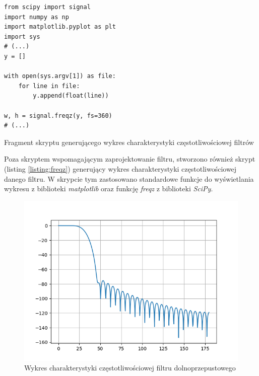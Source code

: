 \begin{listing}
\begin{verbatim}
from scipy import signal
import numpy as np
import matplotlib.pyplot as plt
import sys
# (...)
y = []

with open(sys.argv[1]) as file:
    for line in file:
        y.append(float(line))        

w, h = signal.freqz(y, fs=360)
# (...)
\end{verbatim}
    \caption{Fragment skryptu generującego wykres charakterystyki częstotliwościowej filtrów}
\label{listing:freqz}
\end{listing}


Poza skryptem wspomagającym zaprojektowanie filtru, stworzono również skrypt (listing
\ref{listing:freqz}) generujący wykres charakterystyki częstotliwościowej danego filtru. 
W skrypcie tym zastosowano standardowe funkcje do wyświetlania wykresu z biblioteki \textit{matplotlib} oraz funkcję \textit{freqz} z biblioteki \textit{SciPy}. 

\newpage

\begin{figure}[h!]
    \centering 
    \includegraphics[scale=0.5]{pl/media/lpf.png}
    \caption{Wykres charakterystyki częstotliwościowej filtru dolnoprzepustowego} 
    \label{fig:lpf}
\end{figure}

